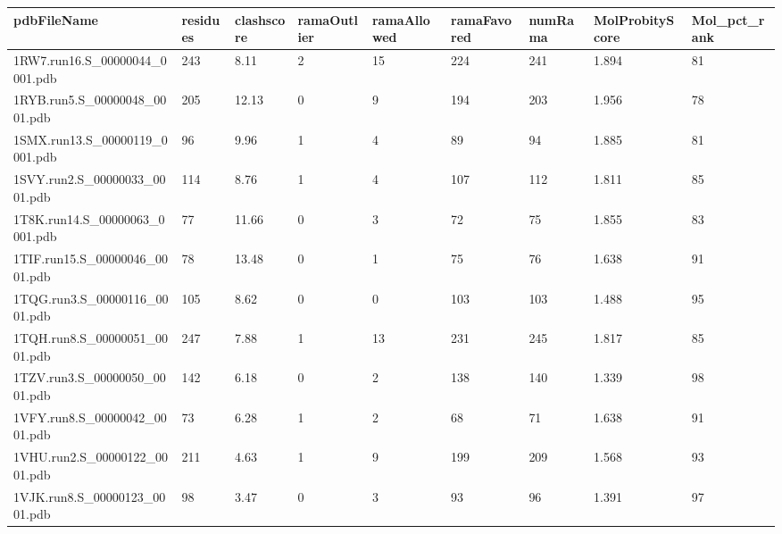 \documentclass{bioinfo}
\begin{document}
\begin{table}[!t]
{\begin{tabular}{lllllllll}\toprule
    pdbFileName             & residues & clashscore & ramaOutlier & ramaAllowed & ramaFavored & numRama & MolProbityScore & Mol\_pct\_rank \\ \midrule
    1RW7.run16.S\_00000044\_0001.pdb & 243      & 8.11       & 2           & 15          & 224         & 241     & 1.894           & 81           \\
    1RYB.run5.S\_00000048\_0001.pdb & 205      & 12.13      & 0           & 9           & 194         & 203     & 1.956           & 78           \\
    1SMX.run13.S\_00000119\_0001.pdb & 96       & 9.96       & 1           & 4           & 89          & 94      & 1.885           & 81           \\
    1SVY.run2.S\_00000033\_0001.pdb & 114      & 8.76       & 1           & 4           & 107         & 112     & 1.811           & 85           \\
    1T8K.run14.S\_00000063\_0001.pdb & 77       & 11.66      & 0           & 3           & 72          & 75      & 1.855           & 83           \\
    1TIF.run15.S\_00000046\_0001.pdb & 78       & 13.48      & 0           & 1           & 75          & 76      & 1.638           & 91           \\
    1TQG.run3.S\_00000116\_0001.pdb & 105      & 8.62       & 0           & 0           & 103         & 103     & 1.488           & 95           \\
    1TQH.run8.S\_00000051\_0001.pdb & 247      & 7.88       & 1           & 13          & 231         & 245     & 1.817           & 85           \\
    1TZV.run3.S\_00000050\_0001.pdb & 142      & 6.18       & 0           & 2           & 138         & 140     & 1.339           & 98           \\
    1VFY.run8.S\_00000042\_0001.pdb & 73       & 6.28       & 1           & 2           & 68          & 71      & 1.638           & 91           \\
    1VHU.run2.S\_00000122\_0001.pdb & 211      & 4.63       & 1           & 9           & 199         & 209     & 1.568           & 93           \\
    1VJK.run8.S\_00000123\_0001.pdb & 98       & 3.47       & 0           & 3           & 93          & 96      & 1.391           & 97           \\

\end{tabular}}
\end{table}
\end{document}

